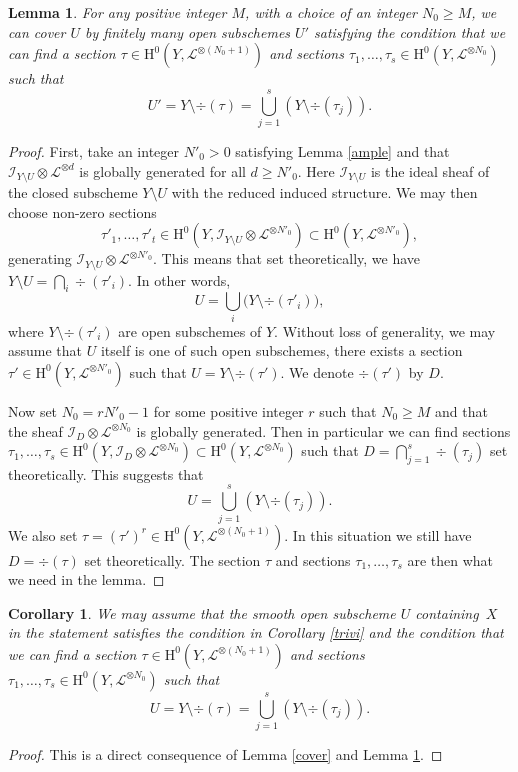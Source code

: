 \documentclass[JEP,XML,SOM,Unicode,published]{cedram}
\theoremstyle{plain}
\newtheorem{cor}[thm]{Corollary}
\newtheorem{lem}[thm]{Lemma}
\theoremstyle{definition}
\newcommand{\ho}{\mathrm{H}}
\newcommand{\li}{\mathcal{L}}
\begin{document}
\begin{lem}\label{complem}
For any positive integer $M$, with a choice of an integer $N_0\geq M$, we can cover $U$ by finitely many open subschemes $U'$ satisfying the condition that we can find a section $\tau\in \ho^0(Y, \li^{\otimes (N_0+1)})$ and sections $\tau_1,\dots, \tau_s\in \ho^0(Y, \li^{\otimes N_0})$ such that\vspace*{-3pt}
\[
U'=Y\setminus\div (\tau)=\bigcup_{j=1}^s\left(Y\setminus\div (\tau_j)\right).
\]
\end{lem}
\begin{proof}[Proof]
First, take an integer $N'_0>0$ satisfying Lemma \ref{ample} and that $\mathcal{I}_{Y\setminus U}\otimes \li^{\otimes d}$ is globally generated for all $d\geq N'_0$. Here $\mathcal{I}_{Y\setminus U}$ is the ideal sheaf of the closed subscheme $Y\setminus U$ with the reduced induced structure. We may then choose non-zero sections\vspace*{-3pt}
\[
\tau'_1,\dots, \tau'_t\in \ho^0(Y, \mathcal{I}_{Y\setminus U}\otimes \li^{\otimes N'_0})\subset \ho^0(Y, \li^{\otimes N'_0}),
\]
generating $\mathcal{I}_{Y\setminus U}\otimes \li^{\otimes N'_0}$. This means that set theoretically, we have $Y\setminus U=\bigcap_{i}\div (\tau'_i)$. In other words,\vspace*{-3pt}
\[
U=\bigcup_{i}\big(Y\setminus\div (\tau'_i) \big),
\]
where $Y\setminus\div (\tau'_i)$ are open subschemes of $Y$. Without loss of generality, we may assume that $U$ itself is one of such open subschemes, \ie there exists a section $\tau'\in \ho^0(Y, \li^{\otimes N'_0})$ such that $U=Y\setminus\div (\tau')$. We denote $\div (\tau')$ by $D$.

Now set $N_0=r N'_0-1$ for some positive integer $r$ such that $N_0\geq M$ and that the sheaf $\mathcal{I}_D\otimes \li^{\otimes N_0}$ is globally generated. Then in particular we can find sections $\tau_1,\dots, \tau_s\in \ho^0(Y, \mathcal{I}_D\otimes \li^{\otimes N_0})\subset \ho^0(Y, \li^{\otimes N_0})$ such that $D=\bigcap_{j=1}^s\div (\tau_j)$ set theoretically. This suggests that\vspace*{-3pt}
\[
U=\bigcup_{j=1}^s\left(Y\setminus\div (\tau_j)\right).
\]
We also set $\tau=(\tau')^r\in \ho^0(Y, \li^{\otimes (N_0+1)})$. In this situation we still have $D=\div (\tau)$ set theoretically. The section $\tau$ and sections $\tau_1,\dots, \tau_s$ are then what we need in the lemma.
\end{proof}

\begin{cor}
We may assume that the smooth open subscheme $U$ containing~$X$ in the statement satisfies the condition in Corollary \ref{trivi} and the condition that we can find a section $\tau\in \ho^0(Y, \li^{\otimes (N_0+1)})$ and sections $\tau_1,\dots, \tau_s\in \ho^0(Y, \li^{\otimes N_0})$ such that\vspace*{-3pt}
\[
U=Y\setminus\div (\tau)=\bigcup_{j=1}^s\left(Y\setminus\div (\tau_j)\right).
\]
\end{cor}
\begin{proof}[Proof]
This is a direct consequence of Lemma \ref{cover} and Lemma \ref{complem}.
\end{proof}
\end{document}
